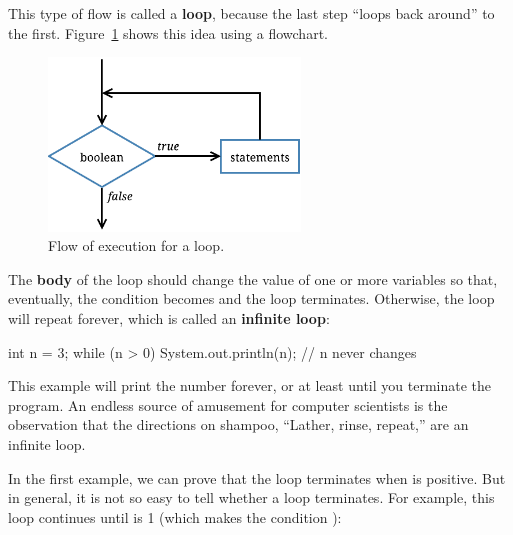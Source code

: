 
This type of flow is called a {\bf loop}, because the last step ``loops back around'' to the first.
Figure~\ref{fig.while} shows this idea using a flowchart.

\begin{figure}[!ht]
\begin{center}
\includegraphics[width=190pt]{figs/while.pdf}
\caption{Flow of execution for a  loop.}
\label{fig.while}
\end{center}
\end{figure}


The {\bf body} of the loop should change the value of one or more variables so that, eventually, the condition becomes  and the loop terminates.
Otherwise, the loop will repeat forever, which is called an {\bf infinite loop}:

\begin{code}
int n = 3;
while (n > 0) {
    System.out.println(n);
    // n never changes
}
\end{code}

This example will print the number  forever, or at least until you terminate the program.
An endless source of amusement for computer scientists is the observation that the directions on shampoo, ``Lather, rinse, repeat,'' are an infinite loop.

In the first example, we can prove that the loop terminates when  is positive.
But in general, it is not so easy to tell whether a loop terminates.
For example, this loop continues until  is 1 (which makes the condition ):


